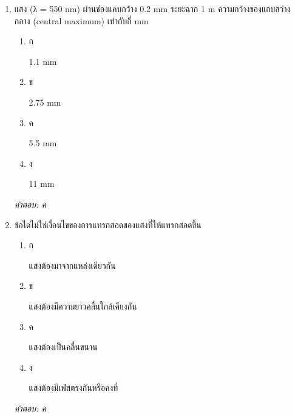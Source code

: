 \documentclass[12pt]{article}
\begin{document}
\begin{enumerate}[label=\arabic*., itemsep=0.5\baselineskip, topsep=0.5\baselineskip, leftmargin=*]
\item แสง (λ = 550 nm) ผ่านช่องแคบกว้าง 0.2 mm ระยะฉาก 1 m ความกว้างของแถบสว่างกลาง (central maximum) เท่ากับกี่ mm
\begin{enumerate}[label=\alph*)., itemsep=0.3\baselineskip, topsep=0.3\baselineskip]
\item ก\ 
\begin{minipage}[t]{0.9\linewidth}
\raggedright 1.1 mm
\end{minipage}
\item ข\ 
\begin{minipage}[t]{0.9\linewidth}
\raggedright 2.75 mm
\end{minipage}
\item ค\ 
\begin{minipage}[t]{0.9\linewidth}
\raggedright 5.5 mm
\end{minipage}
\item ง\ 
\begin{minipage}[t]{0.9\linewidth}
\raggedright 11 mm
\end{minipage}
\end{enumerate}
\vspace{-0.3\baselineskip}
\begin{small}
\textit{คำตอบ: ค}
\end{small}

\item ข้อใดไม่ใช่เงื่อนไขของการแทรกสอดของแสงที่ให้แทรกสอดขึ้น
\begin{enumerate}[label=\alph*)., itemsep=0.3\baselineskip, topsep=0.3\baselineskip]
\item ก\ 
\begin{minipage}[t]{0.9\linewidth}
\raggedright แสงต้องมาจากแหล่งเดียวกัน
\end{minipage}
\item ข\ 
\begin{minipage}[t]{0.9\linewidth}
\raggedright แสงต้องมีความยาวคลื่นใกล้เคียงกัน
\end{minipage}
\item ค\ 
\begin{minipage}[t]{0.9\linewidth}
\raggedright แสงต้องเป็นคลื่นขนาน
\end{minipage}
\item ง\ 
\begin{minipage}[t]{0.9\linewidth}
\raggedright แสงต้องมีเฟสตรงกันหรือคงที่
\end{minipage}
\end{enumerate}
\vspace{-0.3\baselineskip}
\begin{small}
\textit{คำตอบ: ค}
\end{small}


\end{enumerate}
\end{document}
